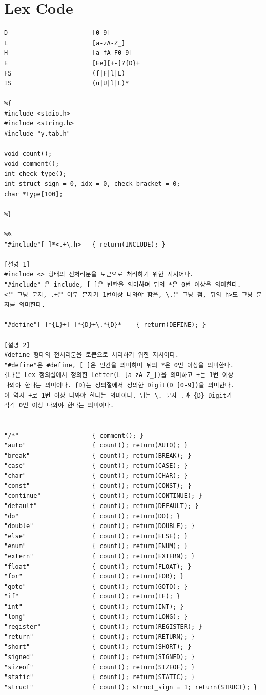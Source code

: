 \documentclass{article}
\begin{document}
\newpage

\section{Lex Code}

\begin{verbatim}
D                       [0-9]
L                       [a-zA-Z_]
H                       [a-fA-F0-9]
E                       [Ee][+-]?{D}+
FS                      (f|F|l|L)
IS                      (u|U|l|L)*

%{
#include <stdio.h>
#include <string.h>
#include "y.tab.h"

void count();
void comment();
int check_type(); 
int struct_sign = 0, idx = 0, check_bracket = 0;
char *type[100];

%}

%%
"#include"[ ]*<.+\.h>   { return(INCLUDE); }

[설명 1]
#include <> 형태의 전처리문을 토큰으로 처리하기 위한 지시어다. 
"#include" 은 include, [ ]은 빈칸을 의미하며 뒤의 *은 0번 이상을 의미한다. 
<은 그냥 문자, .+은 아무 문자가 1번이상 나와야 함을, \.은 그냥 점, 뒤의 h>도 그냥 문자를 의미한다.

"#define"[ ]*{L}+[ ]*{D}+\.*{D}* 	{ return(DEFINE); }

[설명 2]
#define 형태의 전처리문을 토큰으로 처리하기 위한 지시어다.
"#define"은 #define, [ ]은 빈칸을 의미하며 뒤의 *은 0번 이상을 의미한다.
{L}은 Lex 정의절에서 정의한 Letter(L [a-zA-Z_])을 의미하고 +는 1번 이상
나와야 한다는 의미이다. {D}는 정의절에서 정의한 Digit(D [0-9])을 의미한다.
이 역시 +로 1번 이상 나와야 한다는 의미이다. 뒤는 \. 문자 .과 {D} Digit가
각각 0번 이상 나와야 한다는 의미이다.


"/*"                    { comment(); }
"auto"                  { count(); return(AUTO); }
"break"                 { count(); return(BREAK); }
"case"                  { count(); return(CASE); }
"char"                  { count(); return(CHAR); }
"const"                 { count(); return(CONST); }
"continue"              { count(); return(CONTINUE); }
"default"               { count(); return(DEFAULT); }
"do"                    { count(); return(DO); }
"double"                { count(); return(DOUBLE); }
"else"                  { count(); return(ELSE); }
"enum"                  { count(); return(ENUM); }
"extern"                { count(); return(EXTERN); }
"float"                 { count(); return(FLOAT); }
"for"                   { count(); return(FOR); }
"goto"                  { count(); return(GOTO); }
"if"                    { count(); return(IF); }
"int"                   { count(); return(INT); }
"long"                  { count(); return(LONG); }
"register"              { count(); return(REGISTER); }
"return"                { count(); return(RETURN); }
"short"                 { count(); return(SHORT); }
"signed"                { count(); return(SIGNED); }
"sizeof"                { count(); return(SIZEOF); }
"static"                { count(); return(STATIC); }
"struct"                { count(); struct_sign = 1; return(STRUCT); }


\end{verbatim}
\end{document}
